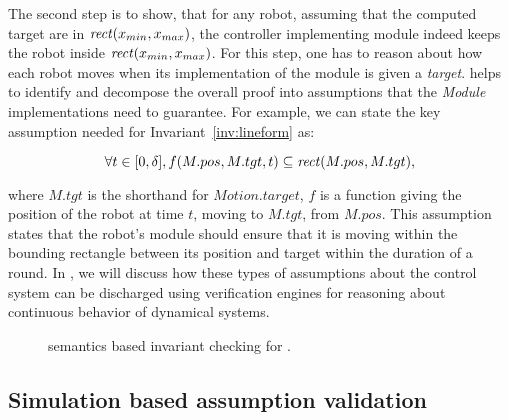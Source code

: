 The second step is to show, that for any robot, assuming that the computed target are in $\mathit{rect}(x_{min}, x_{max})$,
the controller implementing \Motion module indeed keeps the robot inside $\mathit{rect}(x_{min}, x_{max})$.
%
For this step, one has to reason about how each robot moves when its implementation of the \Motion module is given a \emph{target}.
\lgname helps to identify and decompose the overall proof into assumptions that the \emph{Module} implementations need to guarantee.
For example, we can state the key assumption needed for Invariant~\ref{inv:lineform} as:
\begin{assumption}
\label{lineform-assume}
\[
\forall t \in [0, \delta], f(M.pos, M.tgt, t) \subseteq \mathit{rect}(M.pos, M.tgt),
\]
\end{assumption}
\noindent
where $M.tgt$ is the shorthand for $Motion.target$,
$f$ is a function giving the position of the robot at time $t$, moving to $M.tgt$, from $M.pos$.
This assumption states that the robot's \Motion module should ensure that it is moving within the bounding rectangle between its position and target within the duration of a round.
In , we will discuss how these types of assumptions about the control system can be discharged using verification engines for reasoning about continuous behavior of dynamical systems.

\begin{figure}
\caption{\K semantics based invariant checking for \lgname.}
\label{fig:tools}
\end{figure}


\subsection{Simulation based assumption validation}

